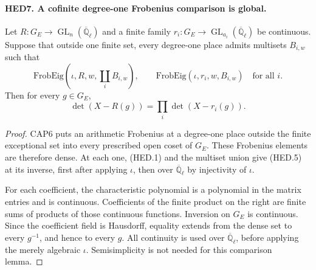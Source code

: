 \documentclass[11pt,a4paper]{article}
\numberwithin{equation}{section}
\theoremstyle{remark}\newtheorem{remark}[theorem]{Remark}
\begin{document}
\paragraph{HED7. A cofinite degree-one Frobenius comparison is global.}
\label{claim:HED7}
Let \(R:G_E\to\operatorname{GL}_n(\overline{\mathbb Q}_\ell)\)
and a finite family \(r_i:G_E\to\operatorname{GL}_{a_i}
(\overline{\mathbb Q}_\ell)\) be continuous.  Suppose that outside
one finite set, every degree-one place admits multisets \(B_{i,w}\)
such that
\[
 \mathrm{FrobEig}(\iota,R,w,\coprod_i B_{i,w}),\qquad
              \mathrm{FrobEig}(\iota,r_i,w,B_{i,w})\quad\text{for all }i.
\]
Then for every \(g\in G_E\),
\[
                  \det(X-R(g))=\prod_i\det(X-r_i(g)).
 \tag{HED.5}
\]
\begin{proof}
CAP6 puts an arithmetic Frobenius at a degree-one place outside
the finite exceptional set into every prescribed open coset of
\(G_E\).  These Frobenius elements are therefore dense.  At each
one, (HED.1) and the multiset union give (HED.5) at its inverse,
first after applying \(\iota\), then over
\(\overline{\mathbb Q}_\ell\) by injectivity of \(\iota\).

For each coefficient, the characteristic polynomial is a polynomial
in the matrix entries and is continuous.  Coefficients of the finite
product on the right are finite sums of products of those continuous
functions.  Inversion on \(G_E\) is continuous.  Since the coefficient
field is Hausdorff, equality extends from the dense set to every
\(g^{-1}\), and hence to every \(g\).  All continuity is used over
\(\overline{\mathbb Q}_\ell\), before applying the merely algebraic
\(\iota\).  Semisimplicity is not needed for this comparison lemma.
\end{proof}

\end{document}
